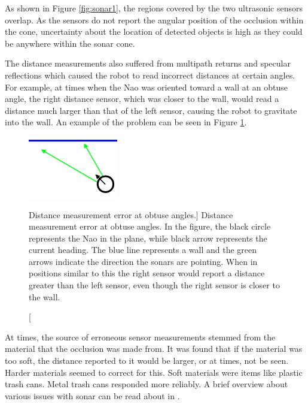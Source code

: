 As shown in Figure \ref{fig:sonar1}, the regions covered by the two ultrasonic sensors overlap. As the sensors do not report the angular position of the occlusion within the cone, uncertainty about the location of detected objects is high as they could be anywhere within the sonar cone.

The distance measurements also suffered from multipath returns and specular reflections which caused the robot to read incorrect distances at certain angles. For example, at times when the Nao was oriented toward a wall at an obtuse angle, the right distance sensor, which was closer to the wall, would read a distance much larger than that of the left sensor, causing the robot to gravitate into the wall. An example of the problem can be seen in Figure \ref{fig:sonar2}.

\begin{figure}[h]
	\centering
	\includegraphics[width=0.35\textwidth]{sonar2.jpg}
	\caption
	[Distance measurement error at obtuse angles.]
	{Distance measurement error at obtuse angles. In the figure, the black circle represents the Nao in the plane, 
		while black arrow represents the current heading. The blue line represents a wall and the green arrows indicate
		the direction the sonars are pointing. When in positions similar to this the right sensor would report a distance
		greater than the left sensor, even though the right sensor is closer to the wall.}
	\label{fig:sonar2}
\end{figure}

At times, the source of erroneous sensor measurements stemmed from the material that the occlusion was made from. It was found that if the material was too soft, the distance reported to it would be larger, or at times, not be seen. Harder materials seemed to correct for this. Soft materials were items like plastic trash cans. Metal trash cans responded more reliably.
A brief overview about various issues with sonar can be read about in \cite{sonar_issues1}.

